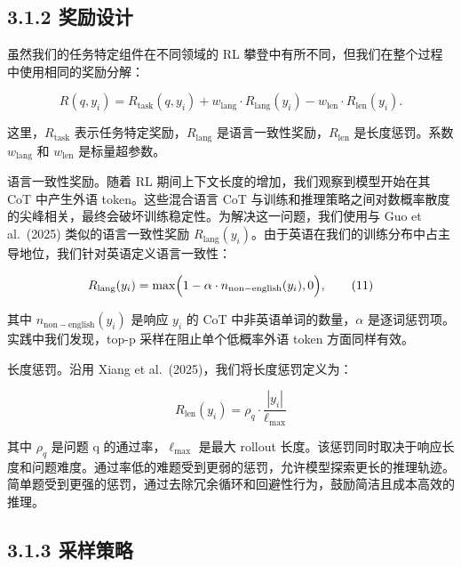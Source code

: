\subsection{3.1.2 奖励设计}\label{reward-design}

虽然我们的任务特定组件在不同领域的 RL 攀登中有所不同，但我们在整个过程中使用相同的奖励分解：

\[
R ( q , y _ { i } ) = R _ { \mathrm { t a s k } } ( q , y _ { i } ) + w _ { \mathrm { l a n g } } \cdot R _ { \mathrm { l a n g } } ( y _ { i } ) - w _ { \mathrm { l e n } } \cdot R _ { \mathrm { l e n } } ( y _ { i } ) .\tag{10}
\]

这里，\(R _ { \mathrm { t a s k } }\) 表示任务特定奖励，\(R _ { \mathrm { l a n g } }\) 是语言一致性奖励，\(R _ { \mathrm { l e n } }\) 是长度惩罚。系数 \(w _ { \mathrm { l a n g } }\) 和 \(w _ { \mathrm { l e n } }\) 是标量超参数。

语言一致性奖励。随着 RL 期间上下文长度的增加，我们观察到模型开始在其 CoT 中产生外语 token。这些混合语言 CoT 与训练和推理策略之间对数概率散度的尖峰相关，最终会破坏训练稳定性。为解决这一问题，我们使用与 Guo et al.~(2025) 类似的语言一致性奖励 \(R _ { \mathrm { l a n g } } ( y _ { i } )\)。由于英语在我们的训练分布中占主导地位，我们针对英语定义语言一致性：

\[
R _ { \mathrm { l a n g } } ( y _ { i } ) = \operatorname* { m a x } \Bigl ( 1 - \alpha \cdot n _ { \mathrm { n o n - e n g l i s h } } ( y _ { i } ) , 0 \Bigr ) ,\tag{11}
\]

其中 \(n _ { \mathrm { n o n - e n g l i s h } } ( y _ { i } )\) 是响应 \(y _ { i }\) 的 CoT 中非英语单词的数量，$\alpha$ 是逐词惩罚项。实践中我们发现，top-p 采样在阻止单个低概率外语 token 方面同样有效。

长度惩罚。沿用 Xiang et al.~(2025)，我们将长度惩罚定义为：

\[
R _ { \mathrm { l e n } } ( y _ { i } ) = \rho _ { q } \cdot \frac { | y _ { i } | } { \ell _ { \mathrm { m a x } } }\tag{12}
\]

其中 \(\rho _ { q }\) 是问题 q 的通过率，\(\ell _ { \mathrm { m a x } }\) 是最大 rollout 长度。该惩罚同时取决于响应长度和问题难度。通过率低的难题受到更弱的惩罚，允许模型探索更长的推理轨迹。简单题受到更强的惩罚，通过去除冗余循环和回避性行为，鼓励简洁且成本高效的推理。

\subsection{3.1.3 采样策略}\label{sampling-strategy}

